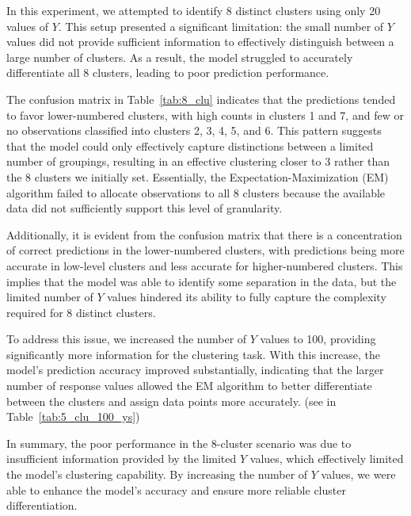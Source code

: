 \documentclass{article}
\begin{document}
In this experiment, we attempted to identify 8 distinct clusters using only 20 values of \(Y\). This setup presented a significant limitation: the small number of \(Y\) values did not provide sufficient information to effectively distinguish between a large number of clusters. As a result, the model struggled to accurately differentiate all 8 clusters, leading to poor prediction performance.

The confusion matrix in Table~\ref{tab:8_clu} indicates that the predictions tended to favor lower-numbered clusters, with high counts in clusters 1 and 7, and few or no observations classified into clusters 2, 3, 4, 5, and 6. This pattern suggests that the model could only effectively capture distinctions between a limited number of groupings, resulting in an effective clustering closer to 3 rather than the 8 clusters we initially set. Essentially, the Expectation-Maximization (EM) algorithm failed to allocate observations to all 8 clusters because the available data did not sufficiently support this level of granularity.

Additionally, it is evident from the confusion matrix that there is a concentration of correct predictions in the lower-numbered clusters, with predictions being more accurate in low-level clusters and less accurate for higher-numbered clusters. This implies that the model was able to identify some separation in the data, but the limited number of \(Y\) values hindered its ability to fully capture the complexity required for 8 distinct clusters.

To address this issue, we increased the number of \(Y\) values to 100, providing significantly more information for the clustering task. 
With this increase, the model's prediction accuracy improved substantially, indicating that the larger number of response values allowed the EM algorithm to better differentiate between the clusters and assign data points more accurately. (see in Table~\ref{tab:5_clu_100_ys})

In summary, the poor performance in the 8-cluster scenario was due to insufficient information provided by the limited \(Y\) values, which effectively limited the model's clustering capability. By increasing the number of \(Y\) values, we were able to enhance the model's accuracy and ensure more reliable cluster differentiation.
\end{document}
